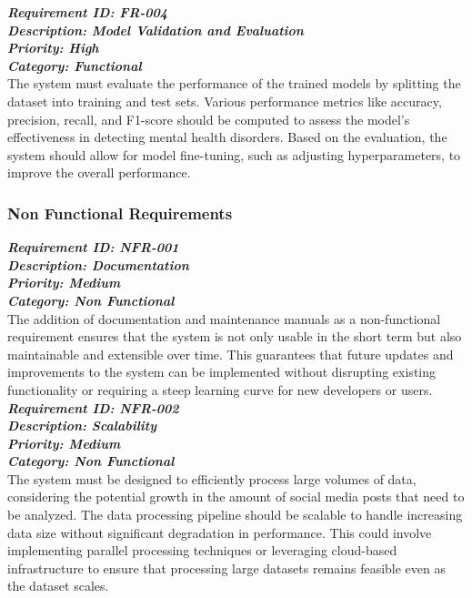 \noindent
\textbf{\emph{Requirement ID: FR-004}} \\ 
\textbf{\emph{Description: Model Validation and Evaluation}} \\
\textbf{\emph{Priority: High}} \\
\textbf{\emph{Category: Functional}} \\
\noindent
The system must evaluate the performance of the trained models by splitting the dataset into training and test sets. Various performance metrics like accuracy, precision, recall, and F1-score should be computed to assess the model’s effectiveness in detecting mental health disorders. Based on the evaluation, the system should allow for model fine-tuning, such as adjusting hyperparameters, to improve the overall performance. 


\subsubsection{Non Functional Requirements}

\noindent
\textbf{\emph{Requirement ID: NFR-001}} \\ 
\textbf{\emph{Description: Documentation}} \\
\textbf{\emph{Priority: Medium}} \\
\textbf{\emph{Category: Non Functional}} \\
\noindent
The addition of documentation and maintenance manuals as a non-functional requirement ensures that the system is not only usable in the short term but also maintainable and extensible over time. This guarantees that future updates and improvements to the system can be implemented without disrupting existing functionality or requiring a steep learning curve for new developers or users. \\

\noindent
\textbf{\emph{Requirement ID: NFR-002}} \\ 
\textbf{\emph{Description:  Scalability}} \\
\textbf{\emph{Priority: Medium}} \\
\textbf{\emph{Category: Non Functional}} \\
\noindent
The system must be designed to efficiently process large volumes of data, considering the potential growth in the amount of social media posts that need to be analyzed. The data processing pipeline should be scalable to handle increasing data size without significant degradation in performance. This could involve implementing parallel processing techniques or leveraging cloud-based infrastructure to ensure that processing large datasets remains feasible even as the dataset scales. 



